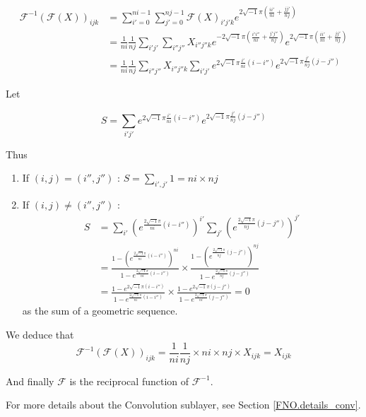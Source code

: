 \begin{align*}
	\mathcal{F}^{-1}(\mathcal{F}(X))_{ijk}&=\sum_{i'=0}^{ni-1}\sum_{j'=0}^{nj-1}\mathcal{F}(X)_{i'j'k}e^{2\sqrt{-1}\pi\left(\frac{ii'}{ni}+\frac{jj'}{nj}\right)} \\	
	&=\frac{1}{ni}\frac{1}{nj}\sum_{i'j'}\sum_{i''j''}X_{i''j''k}e^{-2\sqrt{-1}\pi\left(\frac{i'i''}{ni}+\frac{j'j''}{nj}\right)}e^{2\sqrt{-1}\pi\left(\frac{ii'}{ni}+\frac{jj'}{nj}\right)} \\
	&=\frac{1}{ni}\frac{1}{nj}\sum_{i''j''}X_{i''j''k}\sum_{i'j'}e^{2\sqrt{-1}\pi\frac{i'}{ni}(i-i'')}e^{2\sqrt{-1}\pi\frac{j'}{nj}(j-j'')}
\end{align*}

Let

\begin{equation*}
	S=\sum_{i'j'}e^{2\sqrt{-1}\pi\frac{i'}{ni}(i-i'')}e^{2\sqrt{-1}\pi\frac{j'}{nj}(j-j'')}
\end{equation*}

Thus
\begin{enumerate}[label=\textbullet]
	\item If $(i,j)=(i'',j'')$ : $S=\sum_{i',j'}1=ni\times nj$
	\item If $(i,j)\ne(i'',j'')$ : 
	\begin{align*}
		S&=\sum_{i'}\left(e^{\frac{2\sqrt{-1}\pi}{ni}(i-i'')}\right)^{i'}\sum_{j'}\left(e^{\frac{2\sqrt{-1}\pi}{nj}(j-j'')}\right)^{j'} \\
		&=\frac{1-\left(e^{\frac{2\sqrt{-1}\pi}{ni}(i-i'')}\right)^{ni}}{1-e^{\frac{2\sqrt{-1}\pi}{ni}(i-i'')}}\times \frac{1-\left(e^{\frac{2\sqrt{-1}\pi}{nj}(j-j'')}\right)^{nj}}{1-e^{\frac{2\sqrt{-1}\pi}{nj}(j-j'')}} \\
		&=\frac{1-e^{2\sqrt{-1}\pi(i-i'')}}{1-e^{\frac{2\sqrt{-1}\pi}{ni}(i-i'')}}\times \frac{1-e^{2\sqrt{-1}\pi(j-j'')}}{1-e^{\frac{2\sqrt{-1}\pi}{ni}(j-j'')}}=0
	\end{align*}
	as the sum of a geometric sequence.
\end{enumerate}

We deduce that
\begin{equation*}
	\mathcal{F}^{-1}(\mathcal{F}(X))_{ijk} = \frac{1}{ni}\frac{1}{nj} \times ni\times nj\times X_{ijk} = X_{ijk}
\end{equation*}

And finally $\mathcal{F}$ is the reciprocal function of $\mathcal{F}^{-1}$.

For more details about the Convolution sublayer, see Section \ref{FNO.details_conv}.

